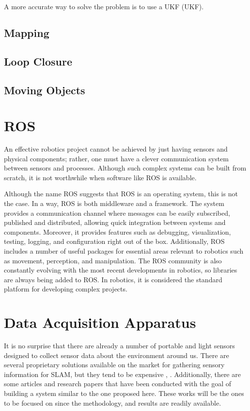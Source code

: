  A more accurate way to solve the problem is to use a \acl*{UKF} (\acs*{UKF}).

 \subsection{Mapping}

\subsection{Loop Closure}

\subsection{Moving Objects}

\section{\acs{ROS}}

An effective robotics project cannot be achieved by just having sensors and physical components; rather, one must have a clever communication system between sensors and processes. Although such complex systems can be built from scratch, it is not worthwhile when software like \acs*{ROS} is available.

Although the name \acl*{ROS} suggests that ROS is an operating system, this is not the case.  In a way, \acs*{ROS} is both middleware and a framework. The system provides a communication channel where messages can be easily subscribed, published and distributed, allowing quick integration between systems and components. Moreover, it provides features such as debugging, visualization, testing, logging, and configuration right out of the box. Additionally, ROS includes a number of useful packages for essential areas relevant to robotics such as movement, perception, and manipulation. The ROS community is also constantly evolving with the most recent developments in robotics, so libraries are always being added to ROS. In robotics, it is considered the standard platform for developing complex projects.


\section{Data Acquisition Apparatus}

It is no surprise that there are already a number of portable and light sensors designed to collect sensor data about the environment around us. There are several proprietary solutions available on the market for gathering sensory information for \acs*{SLAM}, but they tend to be expensive \cite{libackpack_C50}, \cite{libackpack_DGC50}. Additionally, there are some articles and research papers that have been conducted with the goal of building a system similar to the one proposed here. These works will be the ones to be focused on since the methodology, and results are readily available.

